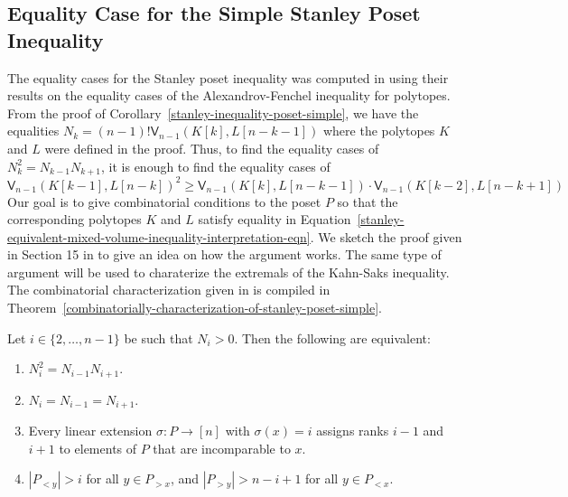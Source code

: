 \documentclass{puthesis-UG}
\begin{document}
\subsection{Equality Case for the Simple Stanley Poset Inequality}

The equality cases for the Stanley poset inequality was computed in \cite{shenfeld2022extremals} using their results on the equality cases of the Alexandrov-Fenchel inequality for polytopes. From the proof of Corollary~\ref{stanley-inequality-poset-simple}, we have the equalities $N_k = (n-1)! \mathsf{V}_{n-1} (K[k], L[n-k-1])$ where the polytopes $K$ and $L$ were defined in the proof. Thus, to find the equality cases of $N_k^2 = N_{k-1} N_{k+1}$, it is enough to find the equality cases of 
\begin{equation} \label{stanley-equivalent-mixed-volume-inequality-interpretation-eqn}
	\mathsf{V}_{n-1}(K[k-1], L[n-k])^2 \geq \mathsf{V}_{n-1}(K[k], L[n-k-1]) \cdot \mathsf{V}_{n-1}(K[k-2], L[n-k+1])
\end{equation}
Our goal is to give combinatorial conditions to the poset $P$ so that the corresponding polytopes $K$ and $L$ satisfy equality in Equation~\ref{stanley-equivalent-mixed-volume-inequality-interpretation-eqn}. We sketch the proof given in Section 15 in \cite{shenfeld2022extremals} to give an idea on how the argument works. The same type of argument will be used to charaterize the extremals of the Kahn-Saks inequality. The combinatorial characterization given in \cite{shenfeld2022extremals} is compiled in Theorem~\ref{combinatorially-characterization-of-stanley-poset-simple}. 

\begin{thm} \label{combinatorially-characterization-of-stanley-poset-simple}
	Let $i \in \{2, \ldots, n-1\}$ be such that $N_i > 0$. Then the following are equivalent:
	\begin{enumerate}[label = (\alph*)]
		\item $N_i^2 = N_{i-1} N_{i+1}$. 
		\item $N_i = N_{i-1} = N_{i+1}$. 
		\item Every linear extension $\sigma : P \to [n]$ with $\sigma(x) = i$ assigns ranks $i-1$ and $i+1$ to elements of $P$ that are incomparable to $x$. 
		\item $|P_{< y}| > i$ for all $y \in P_{> x}$, and $|P_{> y}| > n-i+1$ for all $y \in P_{< x}$. 
	\end{enumerate}
\end{thm}
\end{document}
